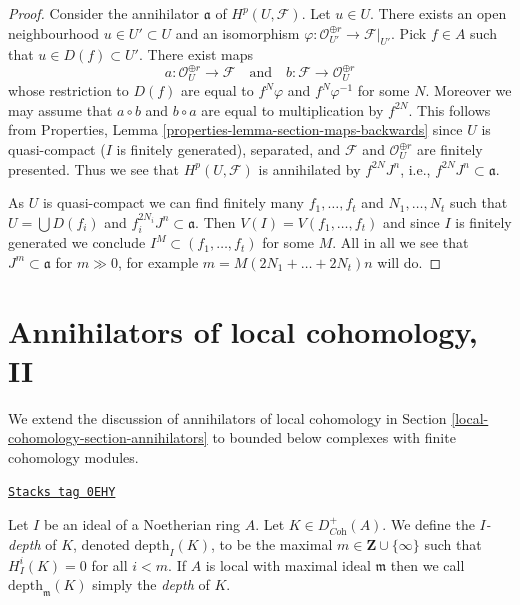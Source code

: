 \begin{proof}
Consider the annihilator $\mathfrak a$ of $H^p(U, \mathcal{F})$.
Let $u \in U$. There exists an open neighbourhood $u \in U' \subset U$
and an isomorphism
$\varphi : \mathcal{O}_{U'}^{\oplus r} \to \mathcal{F}|_{U'}$.
Pick $f \in A$ such that $u \in D(f) \subset U'$.
There exist maps
$$
a : \mathcal{O}_U^{\oplus r} \longrightarrow \mathcal{F}
\quad\text{and}\quad
b : \mathcal{F} \longrightarrow \mathcal{O}_U^{\oplus r}
$$
whose restriction to $D(f)$ are equal to $f^N \varphi$
and $f^N \varphi^{-1}$ for some $N$. Moreover we may assume that
$a \circ b$ and $b \circ a$ are equal to multiplication by $f^{2N}$.
This follows from Properties, Lemma
\ref{properties-lemma-section-maps-backwards}
since $U$ is quasi-compact ($I$ is finitely generated), separated, and
$\mathcal{F}$ and $\mathcal{O}_U^{\oplus r}$ are finitely presented.
Thus we see that $H^p(U, \mathcal{F})$ is annihilated by
$f^{2N}J^n$, i.e., $f^{2N}J^n \subset \mathfrak a$.

\medskip\noindent
As $U$ is quasi-compact we can find finitely many $f_1, \ldots, f_t$
and $N_1, \ldots, N_t$ such that $U = \bigcup D(f_i)$ and
$f_i^{2N_i}J^n \subset \mathfrak a$. Then $V(I) = V(f_1, \ldots, f_t)$
and since $I$ is finitely generated we conclude
$I^M \subset (f_1, \ldots, f_t)$ for some $M$.
All in all we see that $J^m \subset \mathfrak a$ for
$m \gg 0$, for example $m = M (2N_1 + \ldots + 2N_t) n$  will do.
\end{proof}

\section{Annihilators of local cohomology, II}
\label{local-cohomology-section-annihilators-II}
We extend the discussion of annihilators of local cohomology in
Section \ref{local-cohomology-section-annihilators}
to bounded below complexes with finite cohomology modules.

\begin{definition}
\label{local-cohomology-definition-depth-complex}
\href{https://stacks.math.columbia.edu/tag/0EHY}{\texttt{Stacks tag 0EHY}}

Let $I$ be an ideal of a Noetherian ring $A$. Let
$K \in D^+_{\textit{Coh}}(A)$. We define the {\it $I$-depth} of $K$,
denoted $\text{depth}_I(K)$, to be the maximal
$m \in \mathbf{Z} \cup \{\infty\}$ such that $H^i_I(K) = 0$ for all $i < m$.
If $A$ is local with maximal ideal $\mathfrak m$
then we call $\text{depth}_\mathfrak m(K)$ simply the {\it depth} of $K$.
\end{definition}

